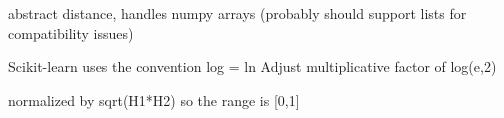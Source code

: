 \documentclass[letterpaper,10pt,english]{sphinxmanual}
\begin{document}

\begin{fulllineitems}
\label{index:halla.distance.Distance}
abstract distance, handles numpy arrays (probably should support lists for compatibility issues)

\end{fulllineitems}


\begin{fulllineitems}
\label{index:halla.distance.MutualInformation}
Scikit-learn uses the convention log = ln
Adjust multiplicative factor of log(e,2)

\end{fulllineitems}


\begin{fulllineitems}
\label{index:halla.distance.NormalizedMutualInformation}
normalized by sqrt(H1*H2) so the range is {[}0,1{]}

\end{fulllineitems}

\end{document}
